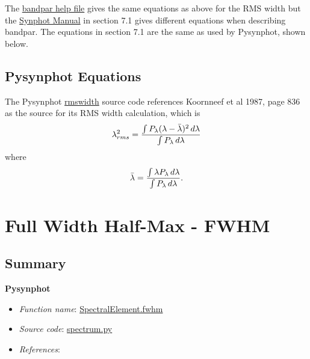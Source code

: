 \documentclass[letterpaper,10pt,english]{sphinxtsr}
\begin{document}
The
\href{https://svn.stsci.edu/trac/ssb/stsci\_python/browser/stsdas/trunk/stsdas/pkg/hst\_calib/synphot/doc/bandpar.hlp}{bandpar help file}
gives the same equations as above for the RMS width but the \href{http://stsdas.stsci.edu/stsci\_python\_epydoc/SynphotManual.pdf}{Synphot Manual}
in section 7.1 gives different equations when describing bandpar. The equations
in section 7.1 are the same as used by Pysynphot, shown below.


\section{Pysynphot Equations}
\label{main:pysynphot-equations}\label{main:rmslam}
The Pysynphot \href{https://trac.assembla.com/astrolib/browser/trunk/pysynphot/lib/pysynphot/spectrum.py\#L1106}{rmswidth} source code references Koornneef et al 1987, page 836
as the source for its RMS width calculation, which is
\begin{gather}
\begin{split}\lambda_{rms}^2 = \frac{\int P_{\lambda} (\lambda - \bar{\lambda})^2 \,d\lambda}
{\int P_{\lambda} \,d\lambda}\end{split}\notag
\end{gather}
where
\begin{gather}
\begin{split}\bar{\lambda} = \frac{\int \lambda P_{\lambda} \,d\lambda}
{\int P_{\lambda} \,d\lambda}.\end{split}\notag
\end{gather}

\chapter{Full Width Half-Max - FWHM}
\label{main:full-width-half-max-fwhm}\label{main:rmswidth}

\section{Summary}
\label{main:id1}
\textbf{Pysynphot}
\begin{itemize}
\item {} 
\emph{Function name}: \href{https://trac.assembla.com/astrolib/browser/trunk/pysynphot/lib/pysynphot/spectrum.py\#L1462}{SpectralElement.fwhm}

\item {} 
\emph{Source code}: \href{https://trac.assembla.com/astrolib/browser/trunk/pysynphot/lib/pysynphot/spectrum.py}{spectrum.py}

\item {} 
\emph{References}:

\end{itemize}
\end{document}
